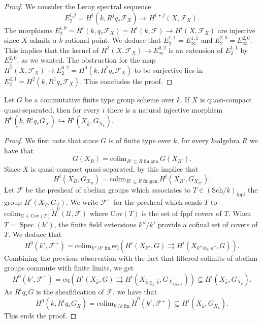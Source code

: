 \documentclass[11pt]{amsart}
\newcommand{\kbar}{{\bar{k}}}
\newcommand{\calF}{\mathcal{F}}
\newcommand{\calU}{\mathcal{U}}
\DeclareMathOperator{\Spec}{Spec}
\newcommand{\fppf}{\mathrm{fppf}}
\begin{document}
\begin{proof}
We consider the Leray spectral sequence
$$E^{i,j}_2=H^i(k,R^jq_{*}\calF_X)\Rightarrow H^{i+j}(X,\calF_X).$$ 	The morphisms $E^{i,0}_2=H^i(k,q_*\calF_X)=H^i(k,\calF)\to H^i(X,\calF_X)$ are injective since $X$ admits a $k$-rational point. We deduce that $E^{1,1}_2=E^{1,1}_\infty$ and $E^{2,0}_2=E^{2,0}_\infty$. This implies that the kernel of $H^2(X,\calF_X)\to E^{0,2}_\infty$ is an extension of $E^{1,1}_2$ by $E^{2,0}_2$, as we wanted. The obstruction for the map $H^2(X,\calF_X)\to E^{0,2}_2=H^0(k,R^2q_*\calF_{X})$ to be surjective lies in $E^{2,1}_2=H^2(k,R^1q_*\calF_X)$. This concludes the proof.
\end{proof}
\begin{lemm}\label{limi:l}
	Let $G$ be a commutative finite type group scheme over $k$. If $X$ is quasi-compact quasi-separated, then for every $i$ there is a natural injective morphism $H^0(k,R^i q_*G_X)\hookrightarrow H^{i}(X_\kbar,G_{X_\kbar})$.
\end{lemm}
\begin{proof}
	We first note that since $G$ is of finite type over $k$, for every $k$-algebra $R$ we have that $$G({X_R})=\mathrm{colim}_{R'\subseteq R\  \mathrm{fin. gen.} }G(X_{R'}).$$ Since $X$ is quasi-compact quasi-separated, by \cite[Tag 073E]{SP22} this implies that $$H^i(X_R,G_{X_R})=\mathrm{colim}_{R'\subseteq R\  \mathrm{fin. gen.} }H^i(X_{R'},G_{X_{R'}}).$$
	Let $\calF$ be the presheaf of abelian groups which associates to $T\in (\mathrm{Sch}/k)_{\fppf}$ the group $H^i(X_T,G_T)$. We write $\calF^+$ for the presheaf which sends $T$ to $\mathrm{colim}_{\calU\in \mathrm{Cov}(T)}\breve{H}^0(\calU,\calF)$ where $\mathrm{Cov}(T)$ is the set of fppf covers of $T$. When $T=\Spec(k')$, the finite field extensions $k''/k'$ provide a cofinal set of covers of $T$. We deduce that $$H^0(k',\calF^+)= \mathrm{colim}_{k''/k'\  \mathrm{fin.}}\mathrm{eq} (H^i(X_{k''},G)\rightrightarrows H^i(X_{k''\otimes_{k'} k''},G)).$$ Combining the previous observation with the fact that filtered colimits of abelian groups commute with finite limits, we get $$H^0(k',\calF^+)=\mathrm{eq} (H^i(X_{\kbar},G)\rightrightarrows H^i(X_{\kbar\otimes_{k'} \kbar},G_{X_{\kbar\otimes_{k'} \kbar}}))\subseteq H^i(X_{\kbar},G_{X_\kbar}).$$ As $R^i q_*G$ is the sheafification of $\calF$, we have that $$H^0(k,R^i q_*G_X)=\mathrm{colim}_{{k'/k\  \mathrm{fin.}}}\breve{H}^0(k',\calF^+)\subseteq H^{i}(X_\kbar,G_{X_\kbar}).$$ This ends the proof.\end{proof}
\end{document}
